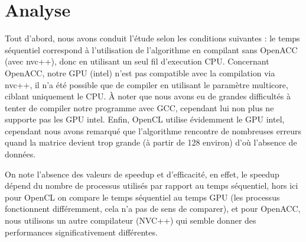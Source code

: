 \documentclass[a4paper, french]{article}
\begin{document}
\begin{center}
\end{center}

\newpage

\section{Analyse}

Tout d'abord, nous avons conduit l'étude selon les conditions suivantes : le temps séquentiel correspond à l'utilisation de l'algorithme en compilant sans OpenACC (avec nvc++), donc en utilisant un seul fil d'execution CPU. Concernant OpenACC, notre GPU (intel) n'est pas compatible avec la compilation via nvc++, il n'a été possible que de compiler en utilisant le paramètre multicore, ciblant uniquement le CPU. À noter que nous avons eu de grandes difficultés à tenter de compiler notre programme avec GCC, cependant lui non plus ne supporte pas les GPU intel. Enfin, OpenCL utilise évidemment le GPU intel, cependant nous avons remarqué que l'algorithme rencontre de nombreuses erreurs quand la matrice devient trop grande (à partir de 128 environ) d'où l'absence de données.

On note l'absence des valeurs de speedup et d'efficacité, en effet, le speedup dépend du nombre de processus utilisés par rapport au temps séquentiel, hors ici pour OpenCL on compare le temps séquentiel au temps GPU (les processus fonctionnent différemment, cela n'a pas de sens de comparer), et pour OpenACC, nous utilisons un autre compilateur (NVC++) qui semble donner des performances significativement différentes.
\end{document}

